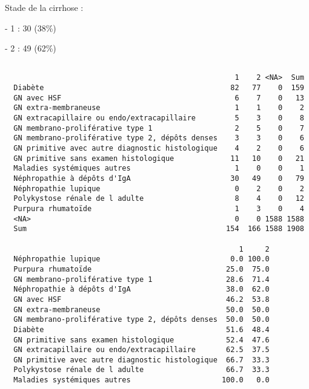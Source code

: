 \documentclass[11pt,a4paper]{article}\usepackage[]{graphicx}\usepackage[]{color}
\makeatletter
\newenvironment{kframe}{%
 \def\at@end@of@kframe{}%
 \ifinner\ifhmode%
  \def\at@end@of@kframe{\end{minipage}}%
  \begin{minipage}{\columnwidth}%
 \fi\fi%
 \def\FrameCommand##1{\hskip\@totalleftmargin \hskip-\fboxsep
 \colorbox{shadecolor}{##1}\hskip-\fboxsep
     \hskip-\linewidth \hskip-\@totalleftmargin \hskip\columnwidth}%
 \MakeFramed {\advance\hsize-\width
   \@totalleftmargin\z@ \linewidth\hsize
   \@setminipage}}%
 {\par\unskip\endMakeFramed%
 \at@end@of@kframe}
\newenvironment{knitrout}{}{} %
\makeatother
\begin{document}
Stade de la cirrhose :

- 1 : 30 (38\%)

- 2 : 49 (62\%)

\begin{knitrout}
\color{fgcolor}\begin{kframe}
\begin{verbatim}
                                                 
                                                     1    2 <NA>  Sum
  Diabète                                           82   77    0  159
  GN avec HSF                                        6    7    0   13
  GN extra-membraneuse                               1    1    0    2
  GN extracapillaire ou endo/extracapillaire         5    3    0    8
  GN membrano-proliférative type 1                   2    5    0    7
  GN membrano-proliférative type 2, dépôts denses    3    3    0    6
  GN primitive avec autre diagnostic histologique    4    2    0    6
  GN primitive sans examen histologique             11   10    0   21
  Maladies systémiques autres                        1    0    0    1
  Néphropathie à dépôts d'IgA                       30   49    0   79
  Néphropathie lupique                               0    2    0    2
  Polykystose rénale de l adulte                     8    4    0   12
  Purpura rhumatoïde                                 1    3    0    4
  <NA>                                               0    0 1588 1588
  Sum                                              154  166 1588 1908
                                                 
                                                      1     2
  Néphropathie lupique                              0.0 100.0
  Purpura rhumatoïde                               25.0  75.0
  GN membrano-proliférative type 1                 28.6  71.4
  Néphropathie à dépôts d'IgA                      38.0  62.0
  GN avec HSF                                      46.2  53.8
  GN extra-membraneuse                             50.0  50.0
  GN membrano-proliférative type 2, dépôts denses  50.0  50.0
  Diabète                                          51.6  48.4
  GN primitive sans examen histologique            52.4  47.6
  GN extracapillaire ou endo/extracapillaire       62.5  37.5
  GN primitive avec autre diagnostic histologique  66.7  33.3
  Polykystose rénale de l adulte                   66.7  33.3
  Maladies systémiques autres                     100.0   0.0
\end{verbatim}
\end{kframe}
\end{knitrout}
~\\
\end{document}
